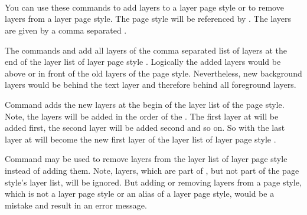 \begin{Declaration}
  \\
  \\
  \\
\end{Declaration}
%
%
%
%
You can use these commands to add layers to a layer page style or to remove 
layers from a layer page style. The page style will be referenced by
. The layers are given by a comma separated
. 

The commands  and 
add all layers of the comma separated list of layers  at
the end of the layer list of layer page style . Logically the added layers would be above or in front of the old
layers of the page style. Nevertheless, new background layers would be behind
the text layer and therefore behind all foreground layers.

Command  adds the new layers at the begin
of the layer list of the page style. Note, the layers
will be added in the order of the . The first layer at
 will be added first, the second layer will be added second
and so on. So with  the last layer at
 will become the new first layer of the layer list of layer
page style .

Command  may be used to remove layers from
the layer list of layer page style  instead of adding
them. Note, layers, which are part of , but not part of
the page style's layer list, will be ignored. But adding or removing layers
from a page style, which is not a layer page style or an alias of a layer page
style, would be a mistake and result in an error message.%
%
%
%

